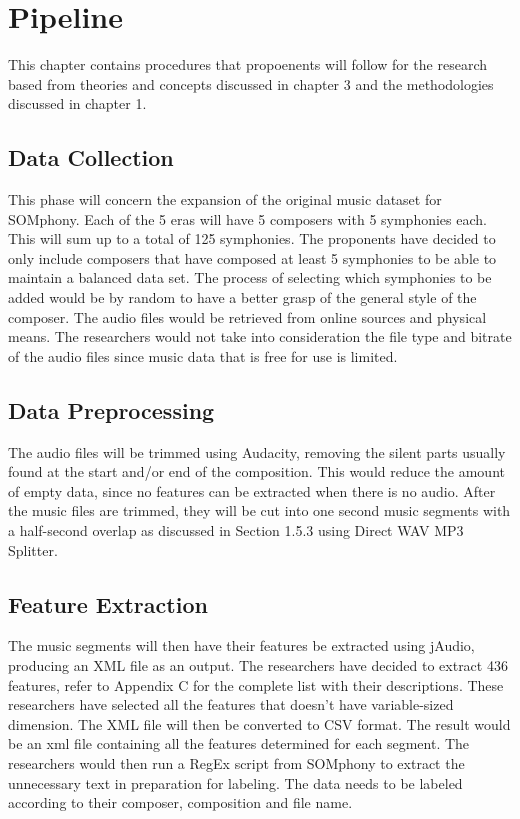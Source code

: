%
%
%                 

\chapter{Pipeline}
This chapter contains procedures that propoenents will follow for the research based from theories and concepts discussed in chapter 3 and the methodologies discussed in chapter 1.

\section{Data Collection}

This phase will concern the  expansion of the original music dataset for SOMphony. Each of the 5 eras will have 5 composers with 5 symphonies each. This will sum up to a total of 125 symphonies. The proponents have decided to only include composers that have composed at least 5 symphonies to be able to maintain a balanced data set. The process of selecting which symphonies to be added would be by random to have a better grasp of the general style of the composer. The audio files would be retrieved from online sources and physical means. The researchers would not take into consideration the file type and bitrate of the audio files since music data that is free for use is limited.

\section{Data Preprocessing}
The audio files will be trimmed using Audacity, removing the silent parts usually found at the start and/or end of the composition. This would reduce the amount of empty data, since no features can be extracted when there is no audio. After the music files are trimmed, they will be cut into one second music segments with a half-second overlap as discussed in Section 1.5.3 using Direct WAV MP3 Splitter.

\section{Feature Extraction}
The music segments will then have their features be extracted using jAudio, producing an XML file as an output. The researchers have decided to extract 436 features, refer to Appendix C for the complete list with their descriptions. These researchers have selected all the features that doesn’t have variable-sized dimension. The XML file will then be converted to CSV format. The result would be an xml file containing all the features determined for each segment. The researchers would then run a RegEx script from SOMphony to extract the unnecessary text in preparation for labeling. The data needs to be labeled according to their composer, composition and file name.

